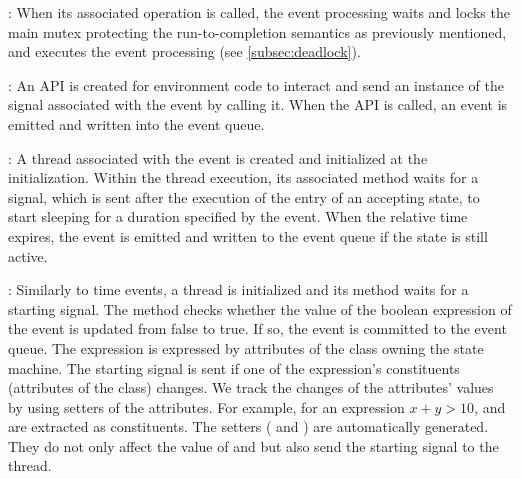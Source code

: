 \vskip 0.1cm	
\noindent
{}:                                            When its associated operation is called, the event processing waits and locks the main mutex protecting the run-to-completion semantics as previously mentioned, and executes the event processing (see \ref{subsec:deadlock}). 

\vskip 0.1cm	
\noindent		
{}:                                          An API  is created for environment code to interact and send an instance of the signal associated with the event by calling it. 
When the API is called, an event is emitted and written into the event queue.                                             
		
		
\vskip 0.1cm	
\noindent		
{}:                                            A thread associated with the event is created and initialized at the initialization.
Within the thread execution, its associated method waits for a signal, which is sent after the execution of the entry of an accepting state, to start sleeping for a duration specified by the event. 
When the relative time expires, the event is emitted and written to the event queue if the state is still active.                                         

\vskip 0.1cm
\noindent		
{}:                                          Similarly to time events, a thread is initialized and its method waits for a starting signal. 
The method checks whether the value of the boolean expression of the event is updated from false to true. 
If so, the event is committed to the event queue.   
The expression is expressed by attributes of the class owning the state machine.
The starting signal is sent if one of the expression's constituents (attributes of the class) changes.
We track the changes of the attributes' values by using setters of the attributes.
For example, for an expression $x + y > 10$,  and  are extracted as constituents.
The setters ( and ) are automatically generated.
They do not only affect the value of  and  but also send the starting signal to the thread.                         


